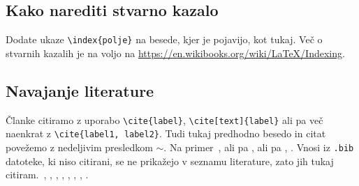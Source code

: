 \subsection{Kako narediti stvarno kazalo}
Dodate ukaze \verb|\index{polje}| na besede, kjer je pojavijo, kot tukaj.
Več o stvarnih kazalih je na voljo na \url{https://en.wikibooks.org/wiki/LaTeX/Indexing}.

\subsection{Navajanje literature}
Članke citiramo z uporabo \verb|\cite{label}|, \verb|\cite[text]{label}| ali pa več naenkrat z
\verb|\cite{label1, label2}|.
Tudi tukaj predhodno besedo in citat povežemo z nedeljivim presledkom
$\sim$. Na primer~\cite{chen2006meshless,liu2001point}, ali pa \cite{kibriya2007empirical}, ali pa
\cite[str.\ 12]{trobec2015parallel}, \cite[enačba (2.3)]{pereira2016convergence}.
Vnosi iz \verb|.bib| datoteke, ki niso citirani, se ne prikažejo v seznamu literature, zato jih
tukaj citiram.~\cite{vene2000categorical}, \cite{gregoric2017stopniceni}, \cite{slak2015induktivni},
\cite{nsphere}, \cite{kearsley1975linearly}, \cite{STtemplate}, \cite{NunbergerTand}, \cite{vanoosten2008realizability}.
